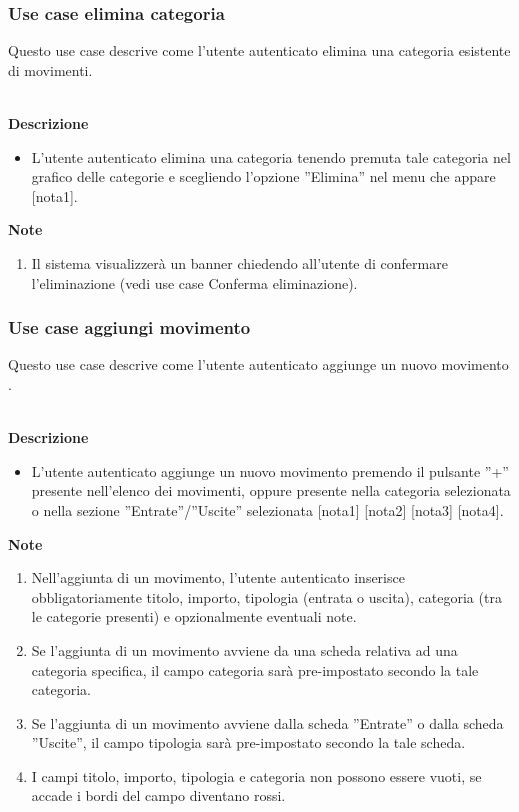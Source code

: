 \documentclass[a4paper,12pt]{article}
\begin{document}
\subsubsection*{Use case elimina categoria}

Questo use case descrive come l'utente autenticato elimina una categoria esistente di movimenti.

\textbf{\\Descrizione}
\begin{itemize} \setlength\itemsep{0.01em}
\item L'utente autenticato elimina una categoria tenendo premuta tale categoria nel grafico delle categorie e scegliendo l'opzione ''Elimina'' nel menu che appare [nota1].
\end{itemize}

\textbf{Note}
\begin{enumerate} \setlength\itemsep{0.01em}
\item Il sistema visualizzerà un banner chiedendo all'utente di confermare l'eliminazione  (vedi use case Conferma eliminazione).
\end{enumerate}



\subsubsection*{Use case aggiungi movimento}

Questo use case descrive come l'utente autenticato aggiunge un nuovo movimento .

\textbf{\\Descrizione}
\begin{itemize} \setlength\itemsep{0.01em}
\item L'utente autenticato aggiunge un nuovo movimento premendo il pulsante ''+'' presente nell'elenco dei movimenti, oppure presente nella categoria selezionata o nella sezione ''Entrate''/''Uscite'' selezionata [nota1] [nota2] [nota3] [nota4].
\end{itemize}

\textbf{Note}
\begin{enumerate} \setlength\itemsep{0.01em}
\item Nell'aggiunta di un movimento, l'utente autenticato inserisce obbligatoriamente titolo, importo, tipologia (entrata o uscita), categoria (tra le categorie presenti) e opzionalmente eventuali note.
\item Se l'aggiunta di un movimento avviene da una scheda relativa ad una categoria specifica, il campo categoria sarà pre-impostato secondo la tale categoria.
\item Se l'aggiunta di un movimento avviene dalla scheda ''Entrate'' o dalla scheda ''Uscite'', il campo tipologia sarà pre-impostato secondo la tale scheda.
\item I campi titolo, importo, tipologia e categoria non possono essere vuoti, se accade i bordi del campo diventano rossi.
\end{enumerate}
\end{document}
